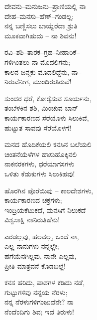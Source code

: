 \begin{myquote}
ದೇವನು–ಮನುಜನು–ಪ್ರಾಣಿಯಲ್ಲಿ ನಾ\\ದೇಹ–ಮನಸು–ಹೆಣ್–ಗಂಡಲ್ಲ;\\ನನ್ನ ಬಣ್ಣಿಸಲು ಬಾಯ್ದೆರೆದಾ ಶ್ರುತಿ\\ಮೂಕವಾಗಿಹುದು – ನಾ ಶಿವನು!
\end{myquote}

\begin{myquote}
ರವಿ–ಶಶಿ–ತಾರಕ–ಗ್ರಹ–ನೀಹಾರಿಕೆ–\\ಗಳಿಗಿಂತಲು ನಾ ಮೊದಲಿಗನು;\\ಕಾಲನ ಜನ್ಮಕು ಮೊದಲಿದ್ದೆನು, ನಾ–\\ನಿರುವೆನೀಗ, ಮುಂದಿರುತಿರುವೆ!
\end{myquote}

\begin{myquote}
ಸುಂದರ ಧರೆ, ಕೋರೈಸುವ ಸೂರ್ಯನು,\\ತಂಬೆಳಕಿನ ಶಶಿ, ಮಿಂಚುವ ಬಾನ್\\ಕಾರ್ಯಕಾರಣದ ಸೆರೆಯೊಳು ಸಿಲುಕಿವೆ,\\ಹುಟ್ಟುತ ಸಾವವು ಸೆರೆಯೊಳಗೆ!
\end{myquote}

\begin{myquote}
ಮನದ ಹೊದಿಕೆಯಲಿ ಕನಸಿನ ಬಲೆಯಲಿ\\ಚಿಂತನೆಯೆಳೆಗಳ ಹಾಸುಹೊಕ್ಕಿನಲಿ\\ನಾಕನರಕಗಳು, ಧರೆಯಾಗಸಗಳು\\ಒಳಿತು ಕೆಡುಕುಗಳು ಸಿಲುಕಿಹವು!
\end{myquote}

\begin{myquote}
ಹೊರಗಿನ ಪೊರೆಯಿವು – ಕಾಲದೇಶಗಳು,\\ಕಾರ್ಯಕಾರಣದ ಚಕ್ರಗಳು;\\ಇಂದ್ರಿಯಕೆಟುಕದೆ, ಮನಸಿಗೆ ನಿಲುಕದೆ\\ವಿಶ್ವಸಾಕ್ಷಿ ನಾನಿರುತಿಹೆನು!
\end{myquote}

\begin{myquote}
ಎರಡಲ್ಲವು, ಹಲವಲ್ಲ, ಒಂದೆ ನಾ,\\ಎಲ್ಲ ನಾನುಗಳು ನನ್ನಲ್ಲೇ;\\ಹಗೆಯೆನಗಿಲ್ಲವು, ನಾನೇ ಎಲ್ಲವು,\\ಪ್ರೀತಿ ಮಾತ್ರವನೆ ಕೊಡಬಲ್ಲೆ!
\end{myquote}

\begin{myquote}
ಕನಸ ಹರಿದು, ಪಾಶಗಳ ಕಡಿದು ನಡೆ,\\ಗುಟ್ಟುಗಳಿವು ನನ್ನಯ ನೆರಳು;\\ನನ್ನ ನೆರಳುಗಳಿಗಂಜುವೆನೇ? ನಾ\\ನೆಂದೆಂದಿಗು ಶಿವ; ಇದೆ ತಿರುಳು!
\end{myquote}

